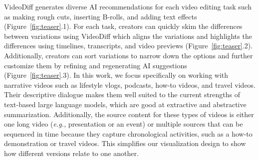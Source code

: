 

 VideoDiff generates diverse AI recommendations for each video editing task such as making rough cuts, inserting B-rolls, and adding text effects (Figure~\ref{fig:teaser}.1). 
For each task, creators can quickly skim the differences between variations using VideoDiff which aligns the variations and highlights the differences using timelines, transcripts, and video previews (Figure~\ref{fig:teaser}.2). 
Additionally, creators can sort variations to narrow down the options and further customize them by refining and regenerating AI suggestions (Figure~\ref{fig:teaser}.3). 
%
In this work, we focus specifically on working with narrative videos such as lifestyle vlogs, podcasts, how-to videos, and travel videos. 
Their descriptive dialogue makes them well suited to the current strengths of text-based large language models, which are good at extractive and abstractive summarization.  Additionally, the source content for these types of videos is either one long video (\textit{e.g.,} presentation or an event) or multiple sources that can be sequenced in time because they capture chronological activities, such as a how-to demonstration or travel videos. This simplifies our visualization design to show how different versions relate to one another. 



